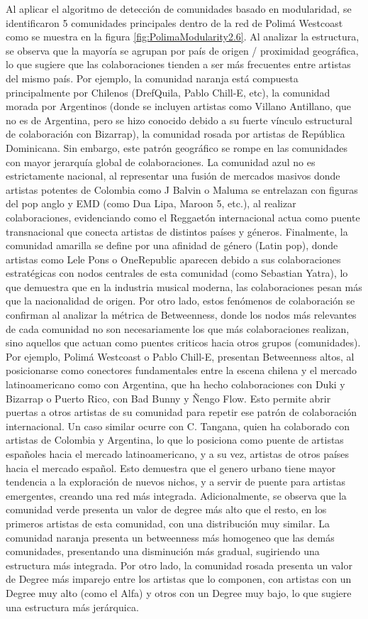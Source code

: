 \documentclass[
	spanish, %
	letterpaper, oneside
]{article}
\begin{document}
Al aplicar el algoritmo de detección de comunidades basado en modularidad, se identificaron 5 comunidades principales dentro de la red de Polimá Westcoast como se muestra en la figura \ref{fig:PolimaModularity2.6}. Al analizar la estructura, se observa que la mayoría se agrupan por país de origen / proximidad geográfica, lo que sugiere que las colaboraciones tienden a ser más frecuentes entre artistas del mismo país. Por ejemplo, la comunidad naranja está compuesta principalmente por Chilenos (DrefQuila, Pablo Chill-E, etc), la comunidad morada por Argentinos (donde se incluyen artistas como Villano Antillano, que no es de Argentina, pero se hizo conocido debido a su fuerte vínculo estructural de colaboración con Bizarrap), la comunidad rosada por artistas de República Dominicana. Sin embargo, este patrón geográfico se rompe en las comunidades con mayor jerarquía global de colaboraciones. La comunidad azul no es estrictamente nacional, al representar una fusión de mercados masivos donde artistas potentes de Colombia como J Balvin o Maluma se entrelazan con figuras del pop anglo y EMD (como Dua Lipa, Maroon 5, etc.), al realizar colaboraciones, evidenciando como el Reggaetón internacional actua como puente transnacional que conecta artistas de distintos países y géneros. Finalmente, la comunidad amarilla se define por una afinidad de género (Latin pop), donde artistas como Lele Pons o OneRepublic aparecen debido a sus colaboraciones estratégicas con nodos centrales de esta comunidad (como Sebastian Yatra), lo que demuestra que en la industria musical moderna, las colaboraciones pesan más que la nacionalidad de origen. Por otro lado, estos fenómenos de colaboración se confirman al analizar la métrica de Betweenness, donde los nodos más relevantes de cada comunidad no son necesariamente los que más colaboraciones realizan, sino aquellos que actuan como puentes criticos hacia otros grupos (comunidades). Por ejemplo, Polimá Westcoast o Pablo Chill-E, presentan Betweenness altos, al posicionarse como conectores fundamentales entre la escena chilena y el mercado latinoamericano como con Argentina, que ha hecho colaboraciones con Duki y Bizarrap o Puerto Rico, con Bad Bunny y Ñengo Flow. Esto permite abrir puertas a otros artistas de su comunidad para repetir ese patrón de colaboración internacional. Un caso similar ocurre con C. Tangana, quien ha colaborado con artistas de Colombia y Argentina, lo que lo posiciona como puente de artistas españoles hacia el mercado latinoamericano, y a su vez, artistas de otros países hacia el mercado español. Esto demuestra que el genero urbano tiene mayor tendencia a la exploración de nuevos nichos, y a servir de puente para artistas emergentes, creando una red más integrada. Adicionalmente, se observa que la comunidad verde presenta un valor de degree más alto que el resto, en los primeros artistas de esta comunidad, con una distribución muy similar. La comunidad naranja presenta un betweenness más homogeneo que las demás comunidades, presentando una disminución más gradual, sugiriendo una estructura más integrada. Por otro lado, la comunidad rosada presenta un valor de Degree más imparejo entre los artistas que lo componen, con artistas con un Degree muy alto (como el Alfa) y otros con un Degree muy bajo, lo que sugiere una estructura más jerárquica. 
\end{document}
